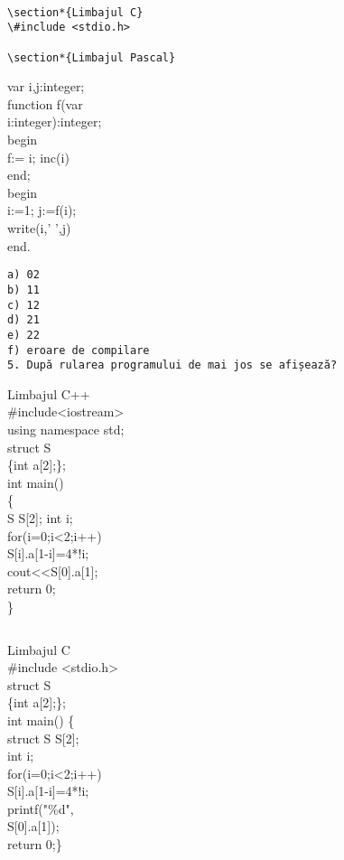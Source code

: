 \begin{verbatim}

\section*{Limbajul C}
\#include <stdio.h>

\section*{Limbajul Pascal}
\end{verbatim}

var i,j:integer;\\
function f(var\\
i:integer):integer;\\
begin\\
f:= i; inc(i)\\
end;\\
begin\\
i:=1; j:=f(i);\\
write(i,' ',j)\\
end.

\begin{verbatim}
a) 02
b) 11
c) 12
d) 21
e) 22
f) eroare de compilare
5. După rularea programului de mai jos se afișează?
\end{verbatim}

Limbajul C++\\
\#include<iostream>\\
using namespace std;\\
struct S\\[0pt]
\{int a[2];\};\\
int main()\\
\{\\[0pt]
S S[2]; int i;\\
for(i=0;i<2;i++)\\[0pt]
S[i].a[1-i]=4*!i;\\[0pt]
cout<<S[0].a[1];\\
return 0;\\
\}

\begin{verbatim}

\end{verbatim}

Limbajul C\\
\#include <stdio.h>\\
struct S\\[0pt]
\{int a[2];\};\\
int main() \{\\[0pt]
struct S S[2];\\
int i;\\
for(i=0;i<2;i++)\\[0pt]
S[i].a[1-i]=4*!i;\\
printf("\%d",\\[0pt]
S[0].a[1]);\\
return 0;\}

